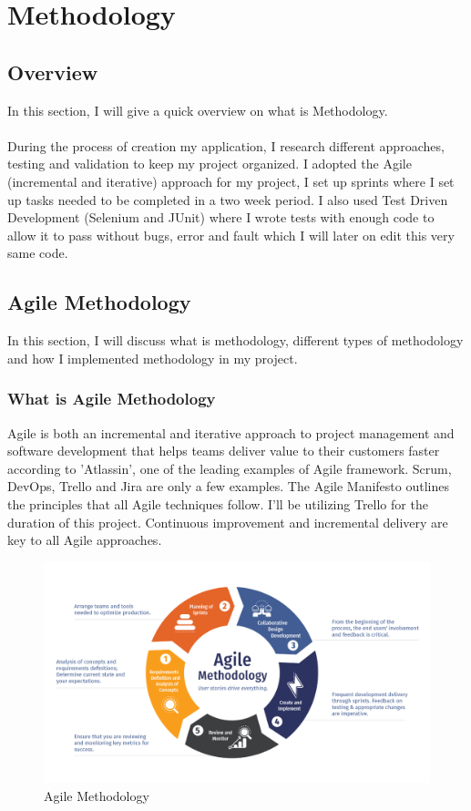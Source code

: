 \chapter{Methodology}

\section{Overview}

In this section, I will give a quick overview on what is Methodology.\\ \\
During the process of creation my application, I research different approaches, testing and validation to keep my project organized. I adopted the Agile (incremental and iterative) approach for my project, I set up sprints where I set up tasks needed to be completed in a two week period. I also used Test Driven Development (Selenium and JUnit) where I wrote tests with enough code to allow it to pass without bugs, error and fault which I will later on edit this very same code.

\section{Agile Methodology}

In this section, I will discuss what is methodology, different types of methodology and how I implemented methodology in my project.

\subsection{What is Agile Methodology}

Agile is both an incremental and iterative approach to project management and software development that helps teams deliver value to their customers faster according to 'Atlassin', one of the leading examples of Agile framework. Scrum, DevOps, Trello and Jira are only a few examples. The Agile Manifesto outlines the principles that all Agile techniques follow. I'll be utilizing Trello for the duration of this project. Continuous improvement and incremental delivery are key to all Agile approaches.

\begin{figure}[H]
  \includegraphics[width=\textwidth]{img/agilemeth.png}
  \caption{Agile Methodology}
  \label{fig: Agile Lifecycle}
\end{figure}

